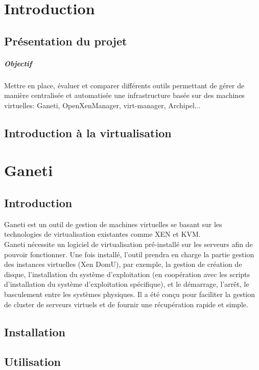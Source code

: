 \chapter{Introduction}
\section{Présentation du projet}
\paragraph{Objectif}
Mettre en place, évaluer et comparer différents outils permettant de gérer de manière
centralisée et automatisée une infrastructure basée sur des machines virtuelles: Ganeti,
OpenXenManager, virt-manager, Archipel...
\section{Introduction à la virtualisation}

\chapter{Ganeti}
\section{Introduction}
Ganeti est un outil de gestion de machines virtuelles se basant sur les technologies de virtualisation existantes comme XEN et KVM.\\
Ganeti nécessite un logiciel de virtualisation pré-installé sur les serveurs afin de pouvoir fonctionner. Une fois installé, 
l'outil prendra en charge la partie gestion des instances virtuelles (Xen DomU), par exemple, la gestion de création de disque, 
l'installation du système d'exploitation (en coopération avec les scripts d'installation du système d'exploitation 
spécifique), et le démarrage, l'arrêt, le basculement entre les systèmes physiques. Il a été conçu pour faciliter la gestion de 
cluster de serveurs virtuels et de fournir une récupération rapide et simple.
\section{Installation}
\section{Utilisation}


